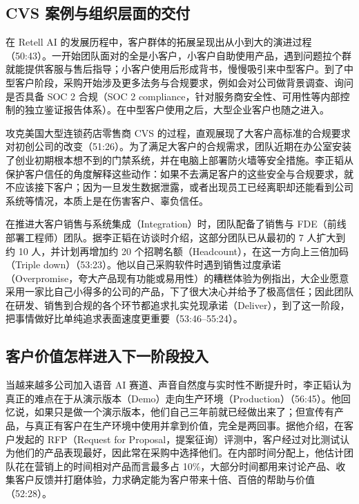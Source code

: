 \documentclass[UTF8,a4paper,11pt,fontset=fandol]{ctexart}
\begin{document}
\subsection{CVS 案例与组织层面的交付}
在 Retell AI 的发展历程中，客户群体的拓展呈现出从小到大的演进过程（50:43）。一开始团队面对的全是小客户，小客户自助使用产品，遇到问题拉个群就能提供客服与售后指导；小客户使用后形成背书，慢慢吸引来中型客户。到了中型客户阶段，采购开始涉及更多法务与合规要求，例如会对公司做背景调查、询问是否具备 SOC 2 合规（SOC 2 compliance，针对服务商安全性、可用性等内部控制的独立鉴证报告体系）。在中型客户使用之后，大型企业客户也随之进入。

攻克美国大型连锁药店零售商 CVS 的过程，直观展现了大客户高标准的合规要求对初创公司的改变（51:26）。为了满足大客户的合规需求，团队近期在办公室安装了创业初期根本想不到的门禁系统，并在电脑上部署防火墙等安全措施。李正韬从保护客户信任的角度解释这些动作：如果不去满足客户的这些安全与合规要求，就不应该接下客户；因为一旦发生数据泄露，或者出现员工已经离职却还能看到公司系统等情况，本质上是在伤害客户、辜负信任。

在推进大客户销售与系统集成（Integration）时，团队配备了销售与 FDE（前线部署工程师）团队。据李正韬在访谈时介绍，这部分团队已从最初的 7 人扩大到约 10 人，并计划再增加约 20 个招聘名额（Headcount），在这一方向上三倍加码（Triple down）（53:23）。他以自己采购软件时遇到销售过度承诺（Overpromise，夸大产品现有功能或易用性）的糟糕体验为例指出，大企业愿意采用一家比自己小得多的公司的产品，下了很大决心并给予了极高信任；因此团队在研发、销售到合规的各个环节都追求扎实兑现承诺（Deliver），到了这一阶段，把事情做好比单纯追求表面速度更重要（53:46–55:24）。

\subsection{客户价值怎样进入下一阶段投入}
当越来越多公司加入语音 AI 赛道、声音自然度与实时性不断提升时，李正韬认为真正的难点在于从演示版本（Demo）走向生产环境（Production）（56:45）。他回忆说，如果只是做一个演示版本，他们自己三年前就已经做出来了；但宣传有产品，与真正有客户在生产环境中使用并拿到价值，完全是两回事。据他介绍，在客户发起的 RFP（Request for Proposal，提案征询）评测中，客户经过对比测试认为他们的产品表现最好，因此常在采购中选择他们。在内部时间分配上，他估计团队花在营销上的时间相对产品而言最多占 10\%，大部分时间都用来讨论产品、收集客户反馈并打磨体验，力求确定能为客户带来十倍、百倍的帮助与价值（52:28）。
\end{document}
